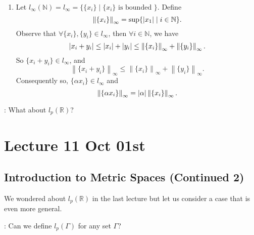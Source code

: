 \documentclass[notoc,notitlepage]{tufte-book}
\newcommand{\norm}[1]{\left\| #1 \right\|}
\begin{document}
\begin{eg}
\begin{enumerate}
    \item Let $l_\infty(\mathbb{N}) = l_\infty = \{ \{ x_i \} \mid \{ x_i \} \text{ is bounded } \}$. Define
      \begin{equation*}
        \norm{ \{ x_i \} }_\infty = \sup \{ \abs{ x_1 } \mid i \in \mathbb{N} \}.
      \end{equation*}
      Observe that $\forall \{ x_i \}, \{ y_i \} \in l_\infty$, then $\forall i \in \mathbb{N}$, we have
      \begin{equation*}
        \abs{x_i + y_i} \leq \abs{ x_i } + \abs{ y_i } \leq \norm{\{x_i\}}_\infty + \norm{\{y_i\}}_\infty.
      \end{equation*}
      So $\{ x_i + y_i \} \in l_\infty$, and
      \begin{equation*}
        \norm{ \{ x_i + y_i \} }_\infty \leq \norm{ \{ x_i\} }_\infty + \norm{ \{ y_i \} }_\infty.
      \end{equation*}
      Consequently so, $\{ \alpha x_i \} \in l_\infty$ and
      \begin{equation*}
        \norm{ \{ \alpha x_i \} }_\infty = \abs{ \alpha } \norm{ \{ x_i \} }_\infty.
      \end{equation*}
  \end{enumerate}
\end{eg}

: What about $l_p(\mathbb{R})$?



\chapter{Lecture 11 Oct 01st}%
\label{chp:lecture_11_oct_01st}

\section{Introduction to Metric Spaces (Continued 2)}%
\label{sec:introduction_to_metric_spaces_continued_2}

We wondered about $l_p(\mathbb{R})$ in the last lecture but let us consider a case that is even more general.

: Can we define $l_p(\Gamma)$ for any set $\Gamma$?
\end{document}
